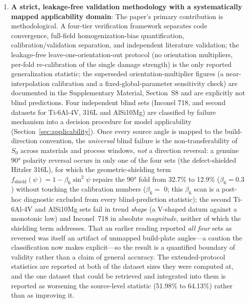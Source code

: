 \documentclass[12pt,a4paper,twocolumn]{article}
\begin{document}
\begin{enumerate}\def\labelenumi{(\arabic{enumi})}
    \item \textbf{A strict, leakage-free validation methodology with a systematically mapped applicability domain}: The paper's primary contribution is methodological. A four-tier verification framework separates code convergence, full-field homogenization-bias quantification, calibration/validation separation, and independent literature validation; the leakage-free leave-one-orientation-out protocol (no orientation multipliers, per-fold re-calibration of the single damage strength) is the only reported generalization statistic; the superseded orientation-multiplier figures (a near-interpolation calibration and a fixed-global-parameter sensitivity check) are documented in the Supplementary Material, Section~S8 and are explicitly not blind predictions. Four independent blind sets (Inconel 718, and second datasets for Ti-6Al-4V, 316L and AlSi10Mg) are classified by failure mechanism into a decision procedure for model applicability (Section~\ref{sec:applicability}). Once every source angle is mapped to the build-direction convention, the \emph{universal} blind failure is the non-transferability of $S_0$ across materials and process windows, \emph{not} a direction reversal: a genuine $\ang{90}$ polarity reversal occurs in only one of the four sets (the defect-shielded Hitzler 316L), for which the geometric-shielding term $f_{\text{shield}}(\psi) = 1 - \beta_6 \sin^2\psi$ repairs the $\ang{90}$ fold from 32.7\% to 12.9\% ($\beta_6 = 0.3$) without touching the calibration numbers ($\beta_6 = $ 0; this $\beta_6$ scan is a post-hoc diagnostic excluded from every blind-prediction statistic); the second Ti-6Al-4V and AlSi10Mg sets fail in trend \emph{shape} (a V-shaped datum against a monotonic law) and Inconel~718 in absolute \emph{magnitude}, neither of which the shielding term addresses. That an earlier reading reported \emph{all four} sets as reversed was itself an artifact of unmapped build-plate angles---a caution the classification now makes explicit---so the result is a quantified boundary of validity rather than a claim of general accuracy. The extended-protocol statistics are reported at both of the dataset sizes they were computed at, and the one dataset that could be retrieved and integrated into them is reported as worsening the source-level statistic (51.98\% to 64.13\%) rather than as improving it.
    

\end{enumerate}
\end{document}
